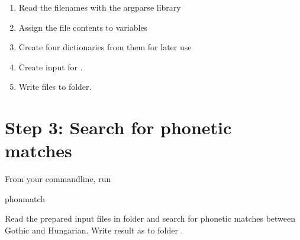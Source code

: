 \documentclass[letterpaper,10pt,english]{sphinxmanual}
\begin{document}
\begin{fulllineitems}
\label{\detokenize{workflow:gothuncommands.loadinput.main}}
\pysigstartsignatures
{}
\pysigstopsignatures\begin{enumerate}
%
\item {} 
\sphinxAtStartPar
Read the filenames with the argparse library

\item {} 
\sphinxAtStartPar
Assign the file contents to variables

\item {} 
\sphinxAtStartPar
Create four dictionaries from them for later use

\item {} 
\sphinxAtStartPar
Create input for .

\item {} 
\sphinxAtStartPar
Write files to  folder.

\end{enumerate}

\end{fulllineitems}



\section{Step 3: Search for phonetic matches}
\label{\detokenize{workflow:step-3-search-for-phonetic-matches}}
\sphinxAtStartPar
From your command\sphinxhyphen{}line, run

\begin{sphinxVerbatim}[commandchars=\\\{\}]
phonmatch
\end{sphinxVerbatim}
\label{\detokenize{workflow:module-gothuncommands.phonmatch}}
\sphinxAtStartPar
Read the prepared input files in folder  and search for phonetic
matches between Gothic and Hungarian. Write result as 
to folder .
\end{document}

